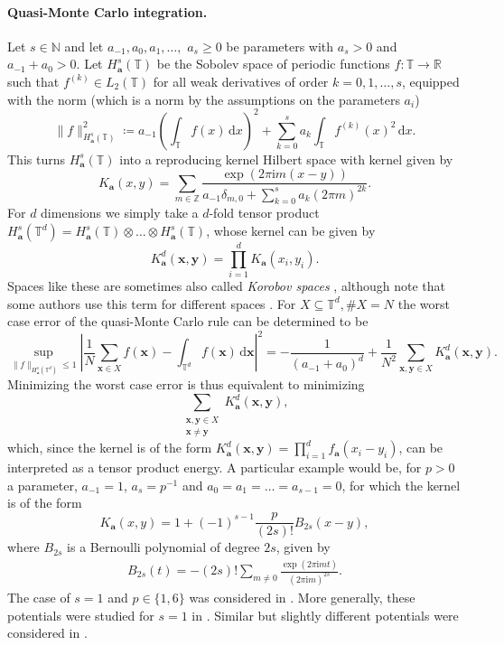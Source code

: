 \documentclass[a4paper,12pt]{article}
\numberwithin{equation}{section}
\theoremstyle{definition}
\newcommand{\ba}{\mathbf{a}}
\newcommand{\bx}{\mathbf{x}}
\newcommand{\by}{\mathbf{y}}
\newcommand{\bbN}{\mathbb{N}}
\newcommand{\bbR}{\mathbb{R}}
\newcommand{\bbT}{\mathbb{T}}
\newcommand{\bbZ}{\mathbb{Z}}
\newcommand{\sbse}{\subseteq}
\newcommand{\iu}{\mathrm{i}}
\newcommand{\dx}{\text{d}}
\begin{document}
\paragraph{Quasi-Monte Carlo integration.} Let $s \in \bbN$ and let $a_{-1}, a_0, a_1, \dots,$ $a_s \geq 0$ be parameters with $a_s > 0$ and $a_{-1}+ a_0 > 0$. Let $H^s_\ba(\bbT)$ be the Sobolev space of periodic functions $f: \bbT \rightarrow \bbR$ such that $f^{(k)} \in L_2(\bbT)$ for all weak derivatives of order $k=0, 1, \dots, s$, equipped with the norm (which is a norm by the assumptions on the parameters $a_i$)
$$
\|f\|_{H^s_\ba(\bbT)}^2 \coloneqq a_{-1} \left(\int_\bbT f(x) \, \dx x\right)^2 + \sum_{k=0}^s a_k \int_\bbT f^{(k)}(x)^2 \, \dx x.
$$
This turns $H^s_\ba(\bbT)$ into a reproducing kernel Hilbert space with kernel given by
$$
K_\ba(x, y) = \sum_{m \in \bbZ} \frac{\exp(2\pi\iu m (x-y))}{a_{-1} \delta_{m, 0} + \sum_{k=0}^s a_k (2\pi m)^{2k}}.
$$
For $d$ dimensions we simply take a $d$-fold tensor product $H^s_\ba(\bbT^d) = H^s_\ba(\bbT) \otimes \dots \otimes H^s_\ba(\bbT)$, whose kernel can be given by
$$
K_\ba^d(\bx, \by) = \prod_{i=1}^d K_\ba(x_i, y_i).
$$
Spaces like these are sometimes also called \emph{Korobov spaces} \cite{Dic08, DSWW06, GL22, Kuo03}, although note that some authors use this term for different spaces \cite{DTU18, KNU25, Kor59}. For $X \sbse \bbT^d, \#X = N$ the worst case error of the quasi-Monte Carlo rule can be determined to be \cite{NW10}
$$
\sup_{\|f\|_{H^s_\ba(\bbT^d)} \leq 1} \left|\frac1N \sum_{\bx \in X} f(\bx) - \int_{\bbT^d} f(\bx) \, \dx\bx\right|^2 = -\frac1{(a_{-1} + a_0)^d} + \frac1{N^2} \sum_{\bx, \by \in X} K_\ba^d(\bx, \by).
$$
Minimizing the worst case error is thus equivalent to minimizing
$$
\sum_{\substack{\bx, \by \in X \\ \bx \neq \by}} K_\ba^d(\bx, \by),
$$
which, since the kernel is of the form $K_\ba^d(\bx, \by) = \prod_{i=1}^d f_\ba(x_i-y_i)$, can be interpreted as a tensor product energy. A particular example would be, for $p > 0$ a parameter, $a_{-1} = 1$, $a_{s} = p^{-1}$ and $a_0 = a_1 = \dots = a_{s-1} = 0$, for which the kernel is of the form
$$
K_\ba(x, y) = 1 + (-1)^{s-1} \frac{p}{(2s)!} B_{2s}(x-y),
$$
where $B_{2s}$ is a Bernoulli polynomial of degree $2s$, given by
\begin{align} \label{eq:Bernoulli_poly}
	B_{2s}(t) = - (2s)! \sum_{m \neq 0} \frac{\exp(2\pi\iu m t)}{(2\pi\iu m)^{2s}}.
\end{align}
The case of $s = 1$ and $p \in \{1, 6\}$ was considered in \cite{HO16}. More generally, these potentials were studied for $s=1$ in \cite{Nag25b}. Similar but slightly different potentials were considered in \cite{BD13b}.
\end{document}
